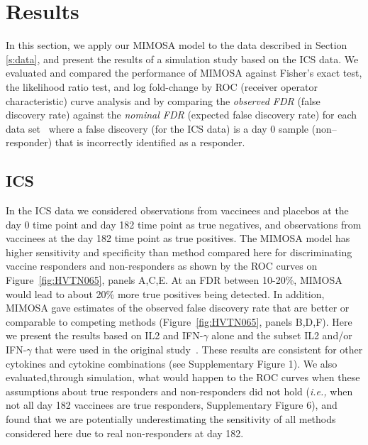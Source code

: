 \documentclass[12pt,oupdraft]{biostatistics}
\begin{document}
\section{Results}
\label{s:results}
In this section, we apply our MIMOSA model to the data described in Section \ref{s:data}, and present the results of a simulation study based on the ICS data. We evaluated and compared the performance of MIMOSA against Fisher's exact test, the likelihood ratio test, and log fold-change by ROC (receiver operator characteristic) curve analysis and by comparing the \textit{observed FDR} (false discovery rate) against the \textit{nominal FDR} (expected false discovery rate) for each data set~\citep{Newton2004} where a false discovery (for the ICS data) is a day 0 sample (non--responder) that is incorrectly identified as a responder.

\subsection{ICS}
In the ICS data we considered observations from vaccinees and placebos at the day 0 time point and day 182 time point as true negatives, and observations from vaccinees at the day 182 time point as true positives. The MIMOSA model has higher sensitivity and specificity than method compared here for discriminating vaccine responders and non-responders  as shown by the ROC curves on Figure~\ref{fig:HVTN065}, panels A,C,E.
At an FDR between 10-20\%, MIMOSA would lead to about 20\% more true positives being detected.
In addition, MIMOSA gave estimates of the observed false discovery rate that are better or comparable to competing methods (Figure~\ref{fig:HVTN065}, panels B,D,F). Here we present the results based on IL2 and IFN-$\gamma$ alone and the subset IL2 and/or IFN-$\gamma$ that were used in the original study~\citep{Goepfert:2011ci}. These results are consistent for other cytokines and cytokine combinations (see Supplementary Figure 1).  We also evaluated,through simulation, what would happen to the ROC curves when these assumptions about true responders and non-responders did not hold (\textit{i.e.,} when not all day 182 vaccinees are true responders, Supplementary Figure 6), and found that we are potentially underestimating the sensitivity of all methods considered here due to real non-responders at day 182. 
\end{document}
